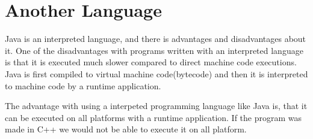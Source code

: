 \section{Another Language}
Java is an interpreted language, and there is advantages and disadvantages about it. One of the disadvantages with programs written with an interpreted language is that it is executed much slower compared to direct machine code executions. Java is first compiled to virtual machine code(bytecode) and then it is interpreted to machine code by a runtime application.

The advantage with using a interpeted programming language like Java is, that it can be executed on all platforms with a runtime application. If the program was made in C++ we would not be able to execute it on all platform.